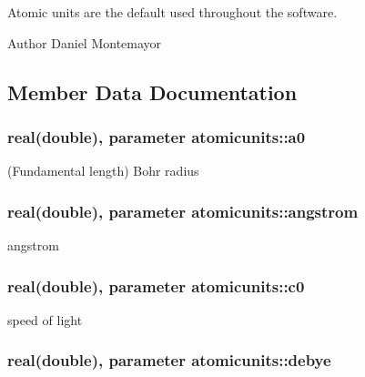 Atomic units are the default used throughout the software. \begin{DoxyAuthor}{Author}
Daniel Montemayor 
\end{DoxyAuthor}


\subsection{Member Data Documentation}
\hypertarget{classatomicunits_aa4859dbb9e7739ae603b78d9f2c58f93}{
\subsubsection[{a0}]{\setlength{\rightskip}{0pt plus 5cm}real(double), parameter atomicunits\+::a0}}\label{classatomicunits_aa4859dbb9e7739ae603b78d9f2c58f93}


(Fundamental length) Bohr radius 

\hypertarget{classatomicunits_a618f9dcd7de9b9ddb53af5bd4f1095c6}{
\subsubsection[{angstrom}]{\setlength{\rightskip}{0pt plus 5cm}real(double), parameter atomicunits\+::angstrom}}\label{classatomicunits_a618f9dcd7de9b9ddb53af5bd4f1095c6}


angstrom 

\hypertarget{classatomicunits_ae35b35bfa15b571da842371a32dcb2e6}{
\subsubsection[{c0}]{\setlength{\rightskip}{0pt plus 5cm}real(double), parameter atomicunits\+::c0}}\label{classatomicunits_ae35b35bfa15b571da842371a32dcb2e6}


speed of light 

\hypertarget{classatomicunits_af82c72bfababde1e5da6ac04a43b8570}{
\subsubsection[{debye}]{\setlength{\rightskip}{0pt plus 5cm}real(double), parameter atomicunits\+::debye}}\label{classatomicunits_af82c72bfababde1e5da6ac04a43b8570}


